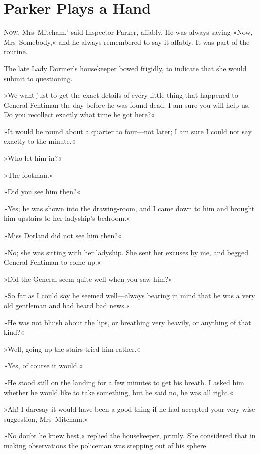 \chapter{Parker Plays a Hand}

\lettrine[lines=4,ante=‘]{N}{ow}, Mrs~Mitcham,' said Inspector Parker, affably. He was always saying »Now, Mrs~Somebody,« and he always remembered to say it affably. It was part of the routine.

\zz
The late Lady Dormer's housekeeper bowed frigidly, to indicate that she would submit to questioning.

»We want just to get the exact details of every little thing that happened to General Fentiman the day before he was found dead. I am sure you will help us. Do you recollect exactly what time he got here?«

»It would be round about a quarter to four—not later; I am sure I could not say exactly to the minute.«

»Who let him in?«

»The footman.«

»Did you see him then?«

»Yes; he was shown into the drawing-room, and I came down to him and brought him upstairs to her ladyship's bedroom.«

»Miss Dorland did not see him then?«

»No; she was sitting with her ladyship. She sent her excuses by me, and begged General Fentiman to come up.«

»Did the General seem quite well when you saw him?«

»So far as I could say he seemed well—always bearing in mind that he was a very old gentleman and had heard bad news.«

»He was not bluish about the lips, or breathing very heavily, or anything of that kind?«

»Well, going up the stairs tried him rather.«

»Yes, of course it would.«

»He stood still on the landing for a few minutes to get his breath. I asked him whether he would like to take something, but he said no, he was all right.«

»Ah! I daresay it would have been a good thing if he had accepted your very wise suggestion, Mrs~Mitcham.«

»No doubt he knew best,« replied the housekeeper, primly. She considered that in making observations the policeman was stepping out of his sphere.

